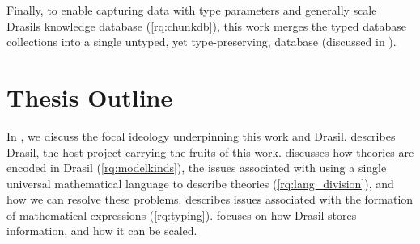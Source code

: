 Finally, to enable capturing data with type parameters and generally scale
Drasils knowledge database (\ref{rq:chunkdb}), this work merges the typed
database collections into a single untyped, yet type-preserving, database
(discussed in ).

\section{Thesis Outline}
\label{sec:intro:outline}

In , we discuss the focal ideology underpinning this work
and Drasil.  describes Drasil, the host project carrying the
fruits of this work.  discusses how theories are encoded
in Drasil (\ref{rq:modelkinds}), the issues associated with using a single
universal mathematical language to describe theories (\ref{rq:lang_division}),
and how we can resolve these problems.  describes issues
associated with the formation of mathematical expressions (\ref{rq:typing}).
 focuses on how Drasil stores information, and how it
can be scaled.
